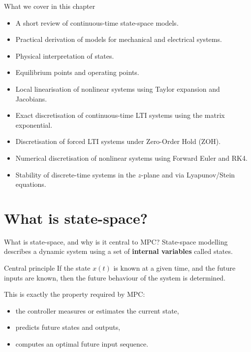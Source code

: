 \documentclass[aspectratio=169,10pt]{beamer}
\begin{document}
\begin{frame}{What we cover in this chapter}
\begin{itemize}
  \item A short review of continuous-time state-space models.
  \item Practical derivation of models for mechanical and electrical systems.
  \item Physical interpretation of states.
  \item Equilibrium points and operating points.
  \item Local linearisation of nonlinear systems using Taylor expansion and Jacobians.
  \item Exact discretisation of continuous-time LTI systems using the matrix exponential.
  \item Discretisation of forced LTI systems under Zero-Order Hold (ZOH).
  \item Numerical discretisation of nonlinear systems using Forward Euler and RK4.
  \item Stability of discrete-time systems in the \(z\)-plane and via Lyapunov/Stein equations.
\end{itemize}
\end{frame}

\section{What is state-space?}

\begin{frame}{What is state-space, and why is it central to MPC?}
State-space modelling describes a dynamic system using a set of \textbf{internal variables} called states.

\begin{defnbox}{Central principle}
If the state \(x(t)\) is known at a given time, and the future inputs are known, then the future behaviour of the system is determined.
\end{defnbox}

This is exactly the property required by MPC:
\begin{itemize}
  \item the controller measures or estimates the current state,
  \item predicts future states and outputs,
  \item computes an optimal future input sequence.
\end{itemize}
\end{frame}
\end{document}
